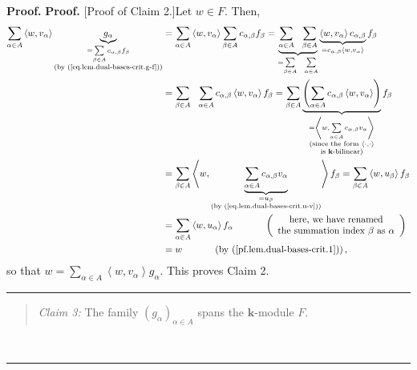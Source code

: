 \documentclass[numbers=enddot,12pt,final,onecolumn,notitlepage]{scrartcl}%
\theoremstyle{definition}
\newenvironment{statement}{\begin{quote}}{\end{quote}}
\newenvironment{proof}[1][Proof]{\noindent\textbf{#1.} }{\ \rule{0.5em}{0.5em}}
\let\sumnonlimits\sum
\renewcommand{\sum}{\sumnonlimits\limits}
\newenvironment{verlong}{}{}
\begin{document}
\begin{proof}
\begin{verlong}
\begin{proof}
[Proof of Claim 2.]Let $w\in F$. Then,
\begin{align*}
\sum_{\alpha\in A}\left\langle w,v_{\alpha}\right\rangle \underbrace{g_{\alpha
}}_{\substack{=\sum_{\beta\in A}c_{\alpha,\beta}f_{\beta}\\\text{(by
(\ref{eq.lem.dual-bases-crit.g-f}))}}}  &  =\sum_{\alpha\in A}\left\langle
w,v_{\alpha}\right\rangle \sum_{\beta\in A}c_{\alpha,\beta}f_{\beta
}=\underbrace{\sum_{\alpha\in A}\ \ \sum_{\beta\in A}}_{=\sum_{\beta\in
A}\ \ \sum_{\alpha\in A}}\underbrace{\left\langle w,v_{\alpha}\right\rangle
c_{\alpha,\beta}}_{=c_{\alpha,\beta}\left\langle w,v_{\alpha}\right\rangle
}f_{\beta}\\
&  =\sum_{\beta\in A}\ \ \sum_{\alpha\in A}c_{\alpha,\beta}\left\langle
w,v_{\alpha}\right\rangle f_{\beta}=\sum_{\beta\in A}\underbrace{\left(
\sum_{\alpha\in A}c_{\alpha,\beta}\left\langle w,v_{\alpha}\right\rangle
\right)  }_{\substack{=\left\langle w,\sum_{\alpha\in A}c_{\alpha,\beta
}v_{\alpha}\right\rangle \\\text{(since the form }\left\langle \cdot
,\cdot\right\rangle \\\text{is }\mathbf{k}\text{-bilinear)}}}f_{\beta}\\
&  =\sum_{\beta\in A}\left\langle w,\underbrace{\sum_{\alpha\in A}%
c_{\alpha,\beta}v_{\alpha}}_{\substack{=u_{\beta}\\\text{(by
(\ref{eq.lem.dual-bases-crit.u-v}))}}}\right\rangle f_{\beta}=\sum_{\beta\in
A}\left\langle w,u_{\beta}\right\rangle f_{\beta}\\
&  =\sum_{\alpha\in A}\left\langle w,u_{\alpha}\right\rangle f_{\alpha
}\ \ \ \ \ \ \ \ \ \ \left(
\begin{array}
[c]{c}%
\text{here, we have renamed}\\
\text{the summation index }\beta\text{ as }\alpha
\end{array}
\right) \\
&  =w\ \ \ \ \ \ \ \ \ \ \left(  \text{by (\ref{pf.lem.dual-bases-crit.1}%
)}\right)  ,
\end{align*}
so that $w=\sum_{\alpha\in A}\left\langle w,v_{\alpha}\right\rangle g_{\alpha
}$. This proves Claim 2.
\end{proof}
\end{verlong}

\begin{statement}
\textit{Claim 3:} The family $\left(  g_{\alpha}\right)  _{\alpha\in A}$ spans
the $\mathbf{k}$-module $F$.
\end{statement}


\end{proof}
\end{document}
